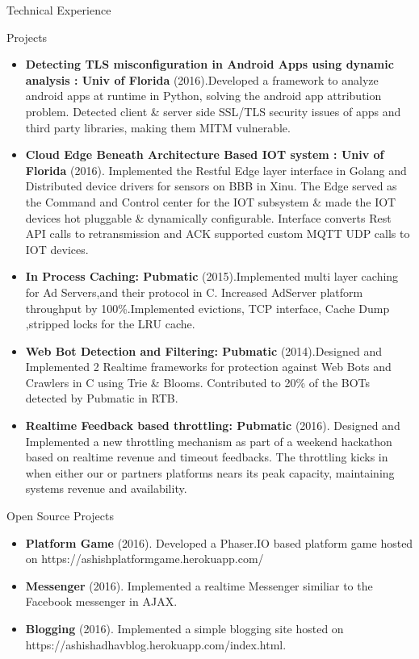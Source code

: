 \documentclass[]{mcdowellcv}
\begin{document}
	\begin{cvsection}{Technical Experience}
		\begin{cvsubsection}{Projects}{}{}
			\begin{itemize}
				\item \textbf{Detecting TLS misconfiguration in Android Apps using dynamic analysis : Univ of Florida} (2016).Developed a framework to analyze android apps at runtime in Python, solving the android app attribution problem. Detected client \& server side SSL/TLS security issues of apps and third party libraries, making them MITM vulnerable.
				\item \textbf{Cloud Edge Beneath Architecture Based IOT system : Univ of Florida} (2016).  Implemented the Restful Edge layer interface in Golang and Distributed device drivers for sensors on BBB in Xinu. The Edge served as the Command and Control center for the IOT subsystem \& made the IOT devices hot pluggable \& dynamically configurable. Interface converts Rest API calls to retransmission and ACK supported custom MQTT UDP calls to IOT devices.
				\item \textbf{In Process Caching: Pubmatic} (2015).Implemented multi layer caching for Ad Servers,and their protocol in C. Increased AdServer platform throughput by 100\%.Implemented evictions, TCP interface, Cache Dump ,stripped locks for the LRU cache.
				
				\item \textbf{Web Bot Detection and Filtering: Pubmatic} (2014).Designed and Implemented 2 Realtime frameworks for protection against Web Bots and Crawlers in C using Trie \& Blooms. Contributed to 20\% of the BOTs detected by Pubmatic in RTB.

				\item \textbf{Realtime Feedback based throttling: Pubmatic} (2016).  Designed and Implemented a new throttling mechanism as part of a weekend hackathon based on realtime revenue and timeout feedbacks. The throttling kicks in when either our or partners platforms nears its peak capacity, maintaining systems revenue and availability.

			\end{itemize}
		\end{cvsubsection}
		\begin{cvsubsection}{Open Source Projects}{}{}
			\begin{itemize}
				\item \textbf{Platform Game} (2016). Developed a Phaser.IO based platform game hosted on https://ashishplatformgame.herokuapp.com/
				\item \textbf{ Messenger} (2016). Implemented a realtime Messenger similiar to the Facebook messenger in AJAX.
				\item \textbf{ Blogging} (2016). Implemented a simple blogging site hosted on https://ashishadhavblog.herokuapp.com/index.html.
			\end{itemize}
		\end{cvsubsection}

	\end{cvsection}
	
\end{document}
